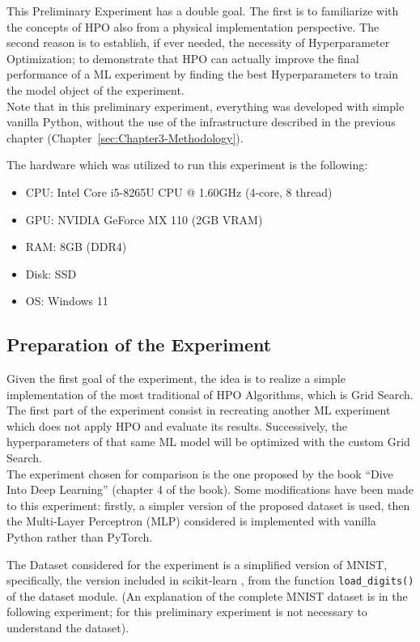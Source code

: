 This Preliminary Experiment has a double goal.
The first is to familiarize with the concepts of HPO also from a physical implementation perspective.
The second reason is to establish, if ever needed, the necessity of Hyperparameter Optimization; to demonstrate that HPO can actually improve the final performance of a ML experiment by finding the best Hyperparameters to train the model object of the experiment.
\\[0.3cm]Note that in this preliminary experiment, everything was developed with simple vanilla Python, without the use of the infrastructure described in the previous chapter (Chapter~\ref{sec:Chapter3-Methodology}).

The hardware which was utilized to run this experiment is the following:
\begin{itemize}[itemsep=0.1cm]
    \item CPU: Intel Core i5-8265U CPU @ 1.60GHz (4-core, 8 thread)
    \item GPU: NVIDIA GeForce MX 110 (2GB VRAM)
    \item RAM: 8GB (DDR4)
    \item Disk: SSD
    \item OS: Windows 11
\end{itemize}

\subsection{Preparation of the Experiment}

Given the first goal of the experiment, the idea is to realize a simple implementation of the most traditional of HPO Algorithms, which is Grid Search.
\\[0.3cm]The first part of the experiment consist in recreating another ML experiment which does not apply HPO and evaluate its results. Successively, the hyperparameters of that same ML model will be optimized with the custom Grid Search.
\\[0.3cm]The experiment chosen for comparison is the one proposed by the book “Dive Into Deep Learning” \cite{Tesi-1.6} (chapter 4 of the book). Some modifications have been made to this experiment: firstly, a simpler version of the proposed dataset is used, then the Multi-Layer Perceptron (MLP) considered is implemented with vanilla Python rather than PyTorch.

The Dataset considered for the experiment is a simplified version of MNIST, specifically, the version included in scikit-learn \cite{scikit-learn}, from the function \texttt{load\_digits()} of the dataset module. (An explanation of the complete MNIST dataset is in the following experiment; for this preliminary experiment is not necessary to understand the dataset).

